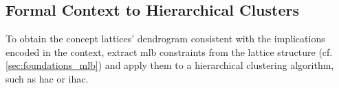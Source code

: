 \subsection{Formal Context to Hierarchical Clusters}
\label{sec:formal_context_to_hierarchical_cluster}

To obtain the concept lattices' dendrogram consistent with the implications encoded in the context, extract \ac{mlb} constraints from the lattice structure (cf. \autoref{sec:foundations_mlb}) and apply them to a hierarchical clustering algorithm, such as \ac{hac} or \ac{ihac}.

%
%
%
%
%

